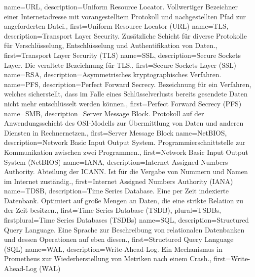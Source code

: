{%
    name={URL},
    description={Uniform Resource Locator. Vollwertiger Bezeichner einer
    Internetadresse mit vorangestelltem Protokoll und nachgestellten
    Pfad zur angeforderten Datei.},
    first={Uniform Resource Locator (URL)}
}
{%
    name={TLS},
    description={Transport Layer Security. Zusätzliche Schicht für
    diverse Protokolle für Verschlüsselung, Entschlüsselung und
    Authentifikation von Daten.},
    first={Transport Layer Security (TLS)}
}
{%
    name={SSL},
    description={Secure Sockets Layer. Die veraltete Bezeichnung für
    TLS.},
    first={Secure Sockets Layer (SSL)}
}
{%
    name={RSA},
    description={Asymmetrisches kryptographisches Verfahren.}
}
{%
    name={PFS},
    description={Perfect Forward Secrecy. Bezeichnung für ein Verfahren,
    welches sicherstellt, dass im Falle eines Schlüsselverlusts bereits
    gesendete Daten nicht mehr entschlüsselt werden können.},
    first={Perfect Forward Secrecy (PFS)}
}
{%
    name={SMB},
    description={Server Message Block. Protokoll auf der
    Anwendungsschicht des OSI-Modells zur Übermittlung von Daten und
    anderen Diensten in Rechnernetzen.},
    first={Server Message Block}
}
{%
    name={NetBIOS},
    description={Network Basic Input Output System.
    Programmierschnittstelle zur Kommunikation zwischen zwei Programmen.},
    first={Network Basic Input Output System (NetBIOS)}
}
{%
    name={IANA},
    description={Internet Assigned Numbers Authority. Abteilung der
    ICANN. Ist für die Vergabe von Nummern und Namen im Internet
    zuständig.},
    first={Internet Assigned Numbers Authority (IANA)}
}
{%
    name={TDSB},
    description={Time Series Database. Eine per Zeit indexierte
    Datenbank. Optimiert auf große Mengen an Daten, die eine strikte
    Relation zu der Zeit besitzen.},
    first={Time Series Database (TSDB)},
    plural={TSDBs},
    firstplural={Time Series Databases (TSDBs)}
}
{%
    name={SQL},
    description={Structured Query Language. Eine Sprache zur
    Beschreibung von relationalen Datenbanken und dessen Operationen auf
    eben diesen.},
    first={Structured Query Language (SQL)}
}
{%
    name={WAL},
    description={Write-Ahead-Log. Ein Mechanismus in Prometheus zur
    Wiederherstellung von Metriken nach einem Crash.},
    first={Write-Ahead-Log (WAL)}
}
